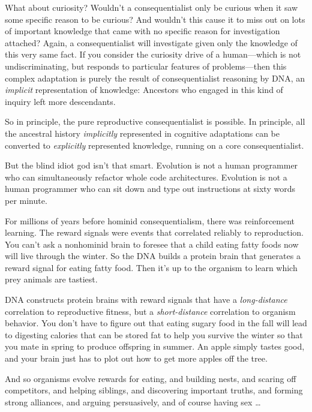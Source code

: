 {
 What about curiosity? Wouldn't a consequentialist
only be curious when it saw some specific reason to be curious? And
wouldn't this cause it to miss out on lots of important
knowledge that came with no specific reason for investigation attached?
Again, a consequentialist will investigate given only the knowledge of
this very same fact. If you consider the curiosity drive of a
human---which is not undiscriminating, but responds to particular
features of problems---then this complex adaptation is purely the
result of consequentialist reasoning by DNA, an \textit{implicit}
representation of knowledge: Ancestors who engaged in this kind of
inquiry left more descendants.}

{
 So in principle, the pure reproductive consequentialist is
possible. In principle, all the ancestral history \textit{implicitly}
represented in cognitive adaptations can be converted to
\textit{explicitly} represented knowledge, running on a core
consequentialist.}

{
 But the blind idiot god isn't that smart.
Evolution is not a human programmer who can simultaneously refactor
whole code architectures. Evolution is not a human programmer who can
sit down and type out instructions at sixty words per minute.}

{
 For millions of years before hominid consequentialism, there was
reinforcement learning. The reward signals were events that correlated
reliably to reproduction. You can't ask a nonhominid
brain to foresee that a child eating fatty foods now will live through
the winter. So the DNA builds a protein brain that generates a reward
signal for eating fatty food. Then it's up to the
organism to learn which prey animals are tastiest.}

{
 DNA constructs protein brains with reward signals that have a
\textit{long-distance} correlation to reproductive fitness, but a
\textit{short-distance} correlation to organism behavior. You
don't have to figure out that eating sugary food in the
fall will lead to digesting calories that can be stored fat to help you
survive the winter so that you mate in spring to produce offspring in
summer. An apple simply tastes good, and your brain just has to plot
out how to get more apples off the tree.}

{
 And so organisms evolve rewards for eating, and building nests,
and scaring off competitors, and helping siblings, and discovering
important truths, and forming strong alliances, and arguing
persuasively, and of course having sex \ldots}

